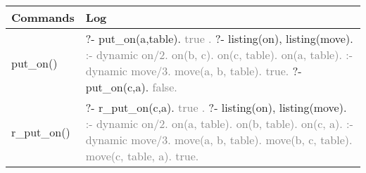 \documentclass{article}
\begin{document}
            \begin{tabular}{|p{6cm}|p{6cm}|}
                \hline
                    \textbf{Commands} & \textbf{Log}\\
                \hline
                    put\_on() & ?- put\_on(a,table).
                    \newline \textcolor{gray}{    true .}
                    \newline ?- listing(on), listing(move).
                    \newline \textcolor{gray}{:- dynamic on/2.}
                    \newline \textcolor{gray}{    on(b, c).}
                    \newline \textcolor{gray}{    on(c, table).}
                    \newline \textcolor{gray}{    on(a, table).}
                    \newline \textcolor{gray}{:- dynamic move/3.}
                    \newline \textcolor{gray}{    move(a, b, table).}
                    \newline \textcolor{gray}{    true.}
                    \newline ?- put\_on(c,a).
                    \newline \textcolor{gray}{    false.}\\
                \hline
                    r\_put\_on() & ?- r\_put\_on(c,a).
                    \newline \textcolor{gray}{    true .}
                    \newline ?- listing(on), listing(move).
                    \newline \textcolor{gray}{:- dynamic on/2.}
                    \newline \textcolor{gray}{    on(a, table).}
                    \newline \textcolor{gray}{    on(b, table).}
                    \newline \textcolor{gray}{    on(c, a).}
                    \newline \textcolor{gray}{:- dynamic move/3.}
                    \newline \textcolor{gray}{    move(a, b, table).}
                    \newline \textcolor{gray}{    move(b, c, table).}
                    \newline \textcolor{gray}{    move(c, table, a).}
                    \newline \textcolor{gray}{    true.}\\

\end{tabular}
\end{document}
